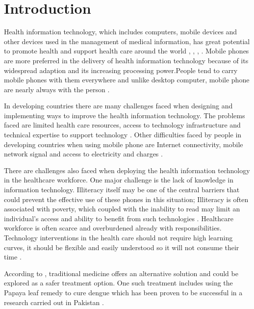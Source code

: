 \documentclass[runningheads,a4paper]{llncs}
\begin{document}
\section{Introduction}


Health information technology, which includes computers, mobile devices and other devices used in the management of medical information, has great potential to promote health and support health care around the world  \cite{Chan2010300}, \cite{Williams2008503}, \cite{Agha201419} \cite{Haux2006795}, \cite{Zuckerman2009965}. Mobile phones are more preferred in the delivery of health information technology because of its widespread adaption and its increasing processing power.People tend to carry mobile phones with them everywhere and unlike desktop computer, mobile phone are nearly always with the person \cite{Klasnja2012184} \cite{Thomas201269}.

In developing countries there are many challenges faced when designing and implementing ways to improve the health information technology. The problems faced are limited health care resources, access to technology infrastructure and technical expertise to support technology \cite{Lluch2011849} \cite{Belanger2012654}. Other difficulties faced by people in developing countries when using mobile phone are Internet connectivity, mobile network signal and access to electricity and charges \cite{Zafar2014236}.

There are challenges also faced when deploying the health information technology in the healthcare workforce. One major challenge is the lack of knowledge in information technology. Illiteracy itself may be one of the central barriers that could prevent the effective use of these phones in this situation; Illiteracy is often associated with poverty, which coupled with the inability to read may limit an individual's access and ability to benefit from such technologies \cite{Chudgar201420}. Healthcare workforce is often scarce and overburdened already with responsibilities. Technology interventions in the health care should not require high learning curves, it should be flexible and easily understood so it will not consume their time \cite{Chan2010300}.

According to \cite{Chawla2014169}, traditional medicine offers an alternative solution and could be explored as a safer treatment option. One such treatment includes using the Papaya leaf remedy to cure dengue which has been proven to be successful in a research carried out in Pakistan \cite{Ahmad2011330}.
\end{document}

